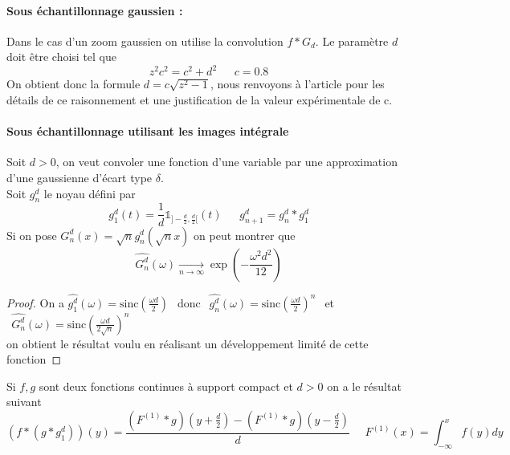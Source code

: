 \paragraph{Sous échantillonnage gaussien :}
Dans le cas d'un zoom gaussien on utilise la convolution $f*G_{d}$. Le paramètre $d$ doit être choisi tel que 
\begin{equation*}
z^2 c^2=c^2 + d^2     ~~~~~~~c= 0.8
\end{equation*}
On obtient donc la formule $d=c\sqrt{z^2 - 1}$, nous renvoyons à l'article \cite{morel2011sift} pour les détails de ce raisonnement et une justification de la valeur expérimentale de c.\\

\paragraph{Sous échantillonnage utilisant les images intégrale }
Soit $d>0$, on veut convoler une fonction d'une variable par une approximation d'une gaussienne d'écart type $\delta$.\\
Soit $g_n^d$ le noyau défini par 
\begin{equation*}
g_1^d(t)=\frac{1}{d}\mathds{1}_{]-\frac{d}{2},\frac{d}{2}[}(t) ~~~~~~~g_{n+1}^d= g_n^d * g_1^d
\end{equation*}
Si on pose $G_n^d(x)=\sqrt{n}g_n^d(\sqrt{n} x)$ on peut montrer que 
\begin{equation*}
\widehat{G_n^d}(\omega)\underset{n\rightarrow\infty}{\rightarrow} \exp\left(-\frac{\omega^2 d^2}{12}\right)
\end{equation*}
\begin{proof}
On a $\widehat{g_1^d}(\omega)=\text{sinc}\left(\frac{\omega d}{2}\right)~~$  donc $~~\widehat{g_n^d}(\omega)=\text{sinc}\left(\frac{\omega d}{2}\right)^n~~$ et 
$~~\widehat{G_n^d}(\omega)=\text{sinc}\left(\frac{\omega d}{2\sqrt{n}}\right)^n~~$\\
on obtient le résultat voulu en réalisant un développement limité de cette fonction 
\end{proof}
Si $f,g$ sont deux fonctions continues à support compact et $d>0$ on a le résultat suivant
\begin{equation*}
(f*(g*g_1^d))(y)=\frac{(F^{(1)}*g)(y+\frac{d}{2})-(F^{(1)}*g)(y-\frac{d}{2})}{d}~~~~~~F^{(1)}(x)=\int_{-\infty}^{x}f(y) dy
\end{equation*}
